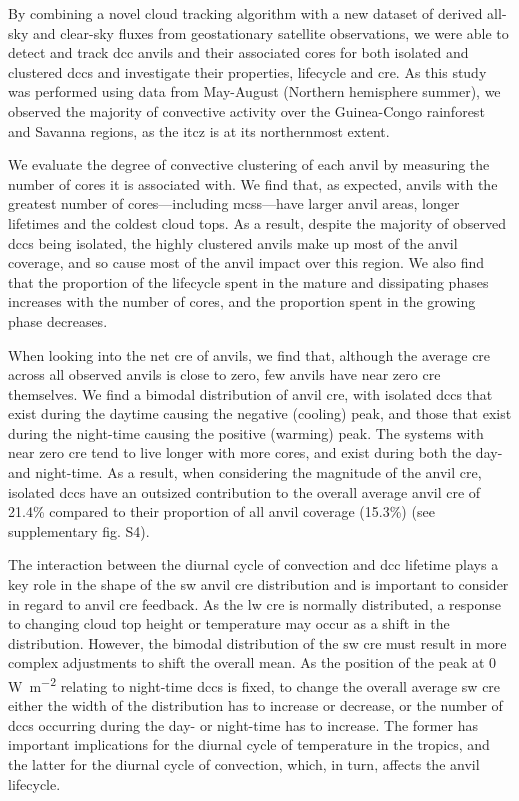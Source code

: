 \documentclass[acp, manuscript]{copernicus}
\begin{document}
\conclusions  %

By combining a novel cloud tracking algorithm with a new dataset of derived all-sky and clear-sky fluxes from geostationary satellite observations, we were able to detect and track \acrshort{dcc} anvils and their associated cores for both isolated and clustered \acrshort{dcc}s and investigate their properties, lifecycle and \acrshort{cre}. 
As this study was performed using data from May-August (Northern hemisphere summer), we observed the majority of convective activity over the Guinea-Congo rainforest and Savanna regions, as the \acrshort{itcz} is at its northernmost extent.

We evaluate the degree of convective clustering of each anvil by measuring the number of cores it is associated with. 
We find that, as expected, anvils with the greatest number of cores---including \acrshort{mcs}s---have larger anvil areas, longer lifetimes and the coldest cloud tops. 
As a result, despite the majority of observed \acrshort{dcc}s being isolated, the highly clustered anvils make up most of the anvil coverage, and so cause most of the anvil impact over this region. 
We also find that the proportion of the lifecycle spent in the mature and dissipating phases increases with the number of cores, and the proportion spent in the growing phase decreases.

When looking into the net \acrshort{cre} of anvils, we find that, although the average \acrshort{cre} across all observed anvils is close to zero, few anvils have near zero \acrshort{cre} themselves. 
We find a bimodal distribution of anvil \acrshort{cre}, with isolated \acrshort{dcc}s that exist during the daytime causing the negative (cooling) peak, and those that exist during the night-time causing the positive (warming) peak. 
The systems with near zero \acrshort{cre} tend to live longer with more cores, and exist during both the day- and night-time. 
As a result, when considering the magnitude of the anvil \acrshort{cre}, isolated \acrshort{dcc}s have an outsized contribution to the overall average anvil \acrshort{cre} of 21.4\% compared to their proportion of all anvil coverage (15.3\%) (see supplementary fig. S4).

The interaction between the diurnal cycle of convection and \acrshort{dcc} lifetime plays a key role in the shape of the \acrshort{sw} anvil \acrshort{cre} distribution and is important to consider in regard to anvil \acrshort{cre} feedback. 
As the \acrshort{lw} \acrshort{cre} is normally distributed, a response to changing cloud top height or temperature may occur as a shift in the distribution. 
However, the bimodal distribution of the \acrshort{sw} \acrshort{cre} must result in more complex adjustments to shift the overall mean. 
As the position of the peak at 0 \,\unit{W m^{-2}} relating to night-time \acrshort{dcc}s is fixed, to change the overall average \acrshort{sw} \acrshort{cre} either the width of the distribution has to increase or decrease, or the number of \acrshort{dcc}s occurring during the day- or night-time has to increase. 
The former has important implications for the diurnal cycle of temperature in the tropics, and the latter for the diurnal cycle of convection, which, in turn, affects the anvil lifecycle.
\end{document}

